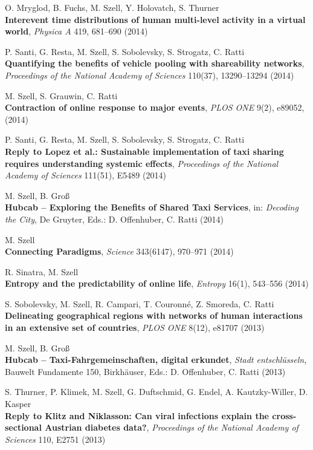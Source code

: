 \documentclass[10pt,a4paper]{article}
\begin{document}
\begin{etaremune}
\item O. Mryglod, B. Fuchs, M. Szell, Y. Holovatch, S. Thurner\\
    \textbf{Interevent time distributions of human multi-level activity in a virtual world}, \textit{Physica A} 419, 681--690 (2014)
\item P. Santi, G. Resta, M. Szell, S. Sobolevsky, S. Strogatz, C. Ratti\\
    \textbf{Quantifying the benefits of vehicle pooling with shareability networks},  \textit{Proceedings of the National Academy of Sciences} 110(37), 13290--13294 (2014)
\item M. Szell, S. Grauwin, C. Ratti\\
    \textbf{Contraction of online response to major events}, \textit{PLOS ONE} 9(2), e89052, (2014)
\item P. Santi, G. Resta, M. Szell, S. Sobolevsky, S. Strogatz, C. Ratti\\
    \textbf{Reply to Lopez et al.: Sustainable implementation of taxi sharing requires understanding systemic effects}, \textit{Proceedings of the National Academy of Sciences} 111(51), E5489 (2014)
\item M. Szell, B. Gro{\ss}\\
    \textbf{Hubcab -- Exploring the Benefits of Shared Taxi Services}, in: \textit{Decoding the City}, De Gruyter, Eds.: D. Offenhuber, C. Ratti (2014)
\item M. Szell\\
    \textbf{Connecting Paradigms}, \textit{Science} 343(6147), 970--971 (2014)
\item R. Sinatra, M. Szell\\
    \textbf{Entropy and the predictability of online life}, \textit{Entropy} 16(1), 543--556 (2014)
\item S. Sobolevsky, M. Szell, R. Campari, T. Couronn\'e, Z. Smoreda, C. Ratti\\
    \textbf{Delineating geographical regions with networks of human interactions in an extensive set of countries}, \textit{PLOS ONE} 8(12), e81707 (2013)
\item M. Szell, B. Gro{\ss}\\
    \textbf{Hubcab -- Taxi-Fahrgemeinschaften, digital erkundet}, \textit{Stadt entschl\"usseln}, Bauwelt Fundamente 150, Birkh\"auser, Eds.: D. Offenhuber, C. Ratti (2013)
\item S. Thurner, P. Klimek, M. Szell, G. Duftschmid, G. Endel, A. Kautzky-Willer, D. Kasper\\
    \textbf{Reply to Klitz and Niklasson: Can viral infections explain the cross-sectional Austrian diabetes data?}, \textit{Proceedings of the National Academy of Sciences} 110, E2751 (2013)

\end{etaremune}
\end{document}

